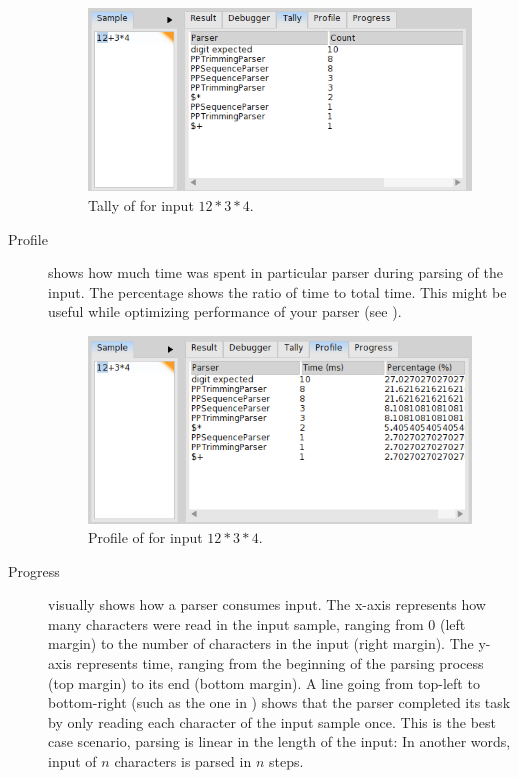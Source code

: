 \documentclass[a4paper,10pt,twoside]{book}
\begin{document}
\begin{description}
\begin{figure}[ht]
  \begin{center}
    \includegraphics[width=.8\linewidth]{tally}
    \caption{Tally of  for input $12*3*4$. \label{fig:pp/tally}}
  \end{center}
\end{figure}
    
\item[Profile] shows how much time was spent in particular parser
  during parsing of the input. The percentage shows the ratio of time
  to total time. This might be useful while optimizing performance of
  your parser (see ).
    
\begin{figure}[ht]
  \begin{center}
    \includegraphics[width=.8\linewidth]{profile}
    \caption{Profile of  for input $12*3*4$. \label{fig:pp/profile}}
  \end{center}
\end{figure}
    
\item[Progress] visually shows how a parser consumes input. The x-axis
  represents how many characters were read in the input sample,
  ranging from 0 (left margin) to the number of characters in the
  input (right margin). The y-axis represents time, ranging from the
  beginning of the parsing process (top margin) to its end (bottom
  margin). A line going from top-left to bottom-right (such as the one
  in ) shows that the parser completed its
  task by only reading each character of the input sample once. This
  is the best case scenario, parsing is linear in the length of the
  input: In another words, input of $n$ characters is parsed in $n$
  steps. 


\end{description}
\end{document}
